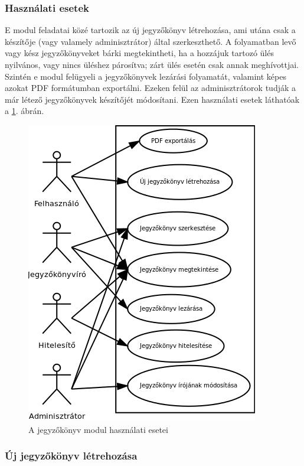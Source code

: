 \documentclass[a4paper,12pt,oneside]{report}
\begin{document}
\subsubsection*{Használati esetek}

E modul feladatai közé tartozik az új jegyzőkönyv létrehozása, ami utána csak a készítője (vagy valamely adminisztrátor) által szerkeszthető. A folyamatban levő vagy kész jegyzőkönyveket bárki megtekintheti, ha a hozzájuk tartozó ülés nyilvános, vagy nincs üléshez párosítva; zárt ülés esetén csak annak meghívottjai. Szintén e modul felügyeli a jegyzőkönyvek lezárási folyamatát, valamint képes azokat PDF formátumban exportálni. Ezeken felül az adminisztrátorok tudják a már létező jegyzőkönyvek készítőjét módosítani. Ezen használati esetek láthatóak a \ref{fig:jegyzokonyv_usecase}. ábrán.

\begin{figure}[h]
    \centering
        \includegraphics[width=.8\textwidth]{jegyzokonyv_usecase.png}
        \caption{A jegyzőkönyv modul használati esetei}
        \label{fig:jegyzokonyv_usecase}
\end{figure}

\subsubsection*{Új jegyzőkönyv létrehozása}
\end{document}

